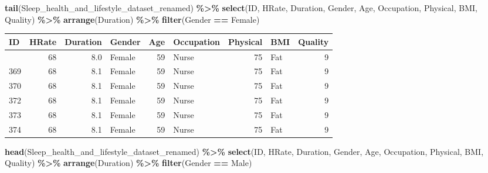 \documentclass[
  11pt,
]{article}
\newenvironment{Shaded}{\begin{snugshade}}{\end{snugshade}}
\newcommand{\FunctionTok}[1]{\textcolor[rgb]{0.13,0.29,0.53}{\textbf{#1}}}
\newcommand{\NormalTok}[1]{#1}
\newcommand{\SpecialCharTok}[1]{\textcolor[rgb]{0.81,0.36,0.00}{\textbf{#1}}}
\newcommand{\StringTok}[1]{\textcolor[rgb]{0.31,0.60,0.02}{#1}}
\begin{document}
\begin{Shaded}
\begin{Highlighting}[]
\FunctionTok{tail}\NormalTok{(Sleep\_health\_and\_lifestyle\_dataset\_renamed) }\SpecialCharTok{\%\textgreater{}\%}
 \FunctionTok{select}\NormalTok{(ID, HRate, Duration, Gender, Age, Occupation, Physical, BMI, Quality) }\SpecialCharTok{\%\textgreater{}\%}
  \FunctionTok{arrange}\NormalTok{(Duration) }\SpecialCharTok{\%\textgreater{}\%}
  \FunctionTok{filter}\NormalTok{(Gender }\SpecialCharTok{==} \StringTok{\textquotesingle{}Female\textquotesingle{}}\NormalTok{)}
\end{Highlighting}
\end{Shaded}

\begin{longtable}[]{@{}lrrlrlrlr@{}}
\toprule\noalign{}
ID & HRate & Duration & Gender & Age & Occupation & Physical & BMI &
Quality \\
\midrule\noalign{}
\endhead
\bottomrule\noalign{}
\endlastfoot
371 & 68 & 8.0 & Female & 59 & Nurse & 75 & Fat & 9 \\
369 & 68 & 8.1 & Female & 59 & Nurse & 75 & Fat & 9 \\
370 & 68 & 8.1 & Female & 59 & Nurse & 75 & Fat & 9 \\
372 & 68 & 8.1 & Female & 59 & Nurse & 75 & Fat & 9 \\
373 & 68 & 8.1 & Female & 59 & Nurse & 75 & Fat & 9 \\
374 & 68 & 8.1 & Female & 59 & Nurse & 75 & Fat & 9 \\
\end{longtable}

\begin{Shaded}
\begin{Highlighting}[]
\FunctionTok{head}\NormalTok{(Sleep\_health\_and\_lifestyle\_dataset\_renamed) }\SpecialCharTok{\%\textgreater{}\%}
 \FunctionTok{select}\NormalTok{(ID, HRate, Duration, Gender, Age, Occupation, Physical, BMI, Quality) }\SpecialCharTok{\%\textgreater{}\%}
  \FunctionTok{arrange}\NormalTok{(Duration) }\SpecialCharTok{\%\textgreater{}\%}
  \FunctionTok{filter}\NormalTok{(Gender }\SpecialCharTok{==} \StringTok{\textquotesingle{}Male\textquotesingle{}}\NormalTok{)}
\end{Highlighting}
\end{Shaded}
\end{document}
